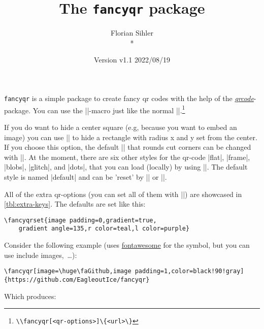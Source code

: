 \documentclass[parskip=half,english,numbers=noenddot,footnotes=nomultiple,oneside]{scrartcl}
\title{The \texttt{fancyqr} package}
\author{%
	\texorpdfstring{Florian Sihler\medskip\\*
		\fancyqr{https://github.com/EagleoutIce/fancyqr}
	}{Florian Sihler}}
\date{Version v1.1 \textendash{} 2022/08/19}
\def\ltx#1{\lstinline/#1/}
\begin{document}
   \maketitle


	\texttt{fancyqr} is a simple package to create fancy qr codes with the help of the \textit{\href{https://www.ctan.org/pkg/qrcode}{qrcode}}-package.
	You can use the |\fancyqr|-macro just like the normal |\qrcode|.\footnote{\ltx{\\fancyqr[<qr-options>]\{<url>\}}}

	If you do want to hide a center square (e.g, because you want to embed an image) you can use || to hide a rectangle with radius x and y set from the center. If you choose this option, the default |\FancyQrRoundCut| that rounds cut corners can be changed with |\FancyQrHardCut|.
	At the moment, there are six other styles for the qr-code |flat|, |frame|, |blobs|, |glitch|, and |dots|, that you can load (locally) by using ||. The default style is named |default| and can be 'reset' by || or |\FancyQrLoadDefault|.

	All of the extra qr-options (you can set all of them with ||) are showcased in \autoref{tbl:extra-keys}.
	The defaults are set like this:
\begin{lstlisting}
\fancyqrset{image padding=0,gradient=true,
	gradient angle=135,r color=teal,l color=purple}
\end{lstlisting}
	Consider the following example (uses \href{https://www.ctan.org/pkg/fontawesome}{fontawesome} for the symbol, but you can use include images,~\ldots):
\begin{lstlisting}
\fancyqr[image=\huge\faGithub,image padding=1,color=black!90!gray]{https://github.com/EagleoutIce/fancyqr}
\end{lstlisting}

	\parbox[c]{.3\linewidth}{Which produces:}\hfill\parbox[c]{.4\linewidth}{\raggedleft{}}\par
\end{document}
